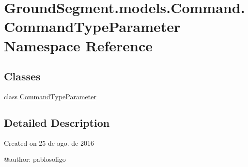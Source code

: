 \hypertarget{namespace_ground_segment_1_1models_1_1_command_1_1_command_type_parameter}{}\section{Ground\+Segment.\+models.\+Command.\+Command\+Type\+Parameter Namespace Reference}
\label{namespace_ground_segment_1_1models_1_1_command_1_1_command_type_parameter}
\subsection*{Classes}
\begin{DoxyCompactItemize}
\item 
class \hyperlink{class_ground_segment_1_1models_1_1_command_1_1_command_type_parameter_1_1_command_type_parameter}{Command\+Type\+Parameter}
\end{DoxyCompactItemize}


\subsection{Detailed Description}
\begin{DoxyVerb}Created on 25 de ago. de 2016

@author: pablosoligo
\end{DoxyVerb}
 